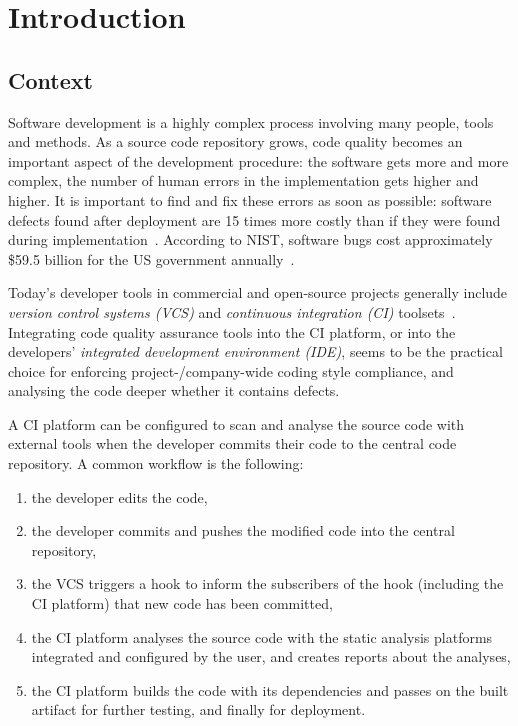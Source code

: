 \chapter{Introduction}
\label{chapter:introduction}


\section{Context}

Software development is a highly complex process involving many people, tools and methods. As a source code repository grows, code quality becomes an important aspect of the development procedure: the software gets more and more complex, the number of human errors in the implementation gets higher and higher. It is important to find and fix these errors as soon as possible: software defects found after deployment are 15 times more costly than if they were found during implementation~\cite{dawson2010integrating}. According to NIST, software bugs cost approximately \$59.5 billion for the US government annually~\cite{tassey2002economic}.

Today's developer tools in commercial and open-source projects generally include \emph{version control systems (VCS)} and \emph{continuous integration (CI)} toolsets~\cite{hilton2016usage, fowlerCI}. Integrating code quality assurance tools into the CI platform, or into the developers' \emph{integrated development environment (IDE)}, seems to be the practical choice for enforcing project-/company-wide coding style compliance, and analysing the code deeper whether it contains defects.

A CI platform can be configured to scan and analyse the source code with external tools when the developer commits their code to the central code repository. A common workflow is the following:

\begin{enumerate}
\item the developer edits the code,
\item the developer commits and pushes the modified code into the central repository,
\item the VCS triggers a hook to inform the subscribers of the hook (including the CI platform) that new code has been committed,
\item the CI platform analyses the source code with the static analysis platforms integrated and configured by the user, and creates reports about the analyses,
\item the CI platform builds the code with its dependencies and passes on the built artifact for further testing, and finally for deployment.
\end{enumerate}

